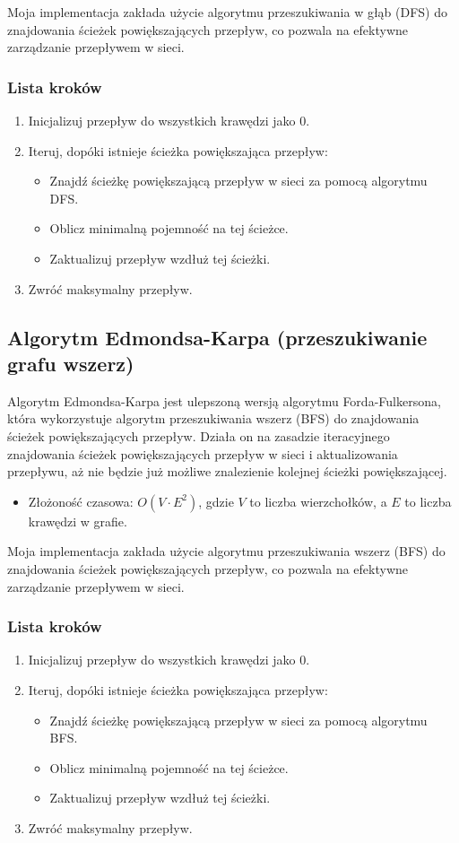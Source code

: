 \documentclass{article}
\begin{document}
Moja implementacja zakłada użycie algorytmu przeszukiwania w głąb (DFS) do znajdowania ścieżek powiększających przepływ, co pozwala na efektywne zarządzanie przepływem w sieci.
\subsubsection{Lista kroków}
\begin{enumerate}
    \item Inicjalizuj przepływ do wszystkich krawędzi jako 0.
    \item Iteruj, dopóki istnieje ścieżka powiększająca przepływ:
    \begin{itemize}
        \item Znajdź ścieżkę powiększającą przepływ w sieci za pomocą algorytmu DFS.
        \item Oblicz minimalną pojemność na tej ścieżce.
        \item Zaktualizuj przepływ wzdłuż tej ścieżki.
    \end{itemize}
    \item Zwróć maksymalny przepływ.
\end{enumerate}

\subsection{Algorytm Edmondsa-Karpa (przeszukiwanie grafu wszerz)}
Algorytm Edmondsa-Karpa jest ulepszoną wersją algorytmu Forda-Fulkersona, która wykorzystuje algorytm przeszukiwania wszerz (BFS) do znajdowania ścieżek powiększających przepływ.
Działa on na zasadzie iteracyjnego znajdowania ścieżek powiększających przepływ w sieci i aktualizowania przepływu, aż nie będzie już możliwe znalezienie kolejnej ścieżki powiększającej.
\begin{itemize}
    \item Złożoność czasowa: $O(V \cdot E^2)$, gdzie $V$ to liczba wierzchołków, a $E$ to liczba krawędzi w grafie.
\end{itemize}
Moja implementacja zakłada użycie algorytmu przeszukiwania wszerz (BFS) do znajdowania ścieżek powiększających przepływ, co pozwala na efektywne zarządzanie przepływem w sieci.
\subsubsection{Lista kroków}
\begin{enumerate}
    \item Inicjalizuj przepływ do wszystkich krawędzi jako 0.
    \item Iteruj, dopóki istnieje ścieżka powiększająca przepływ:
    \begin{itemize}
        \item Znajdź ścieżkę powiększającą przepływ w sieci za pomocą algorytmu BFS.
        \item Oblicz minimalną pojemność na tej ścieżce.
        \item Zaktualizuj przepływ wzdłuż tej ścieżki.
    \end{itemize}
    \item Zwróć maksymalny przepływ.
\end{enumerate}
\end{document}
